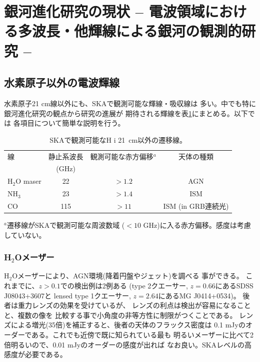 \section{銀河進化研究の現状 -- 電波領域における多波長・他輝線による銀河の観測的研究 --}\label{galaxy.s1.5}


\subsection{水素原子以外の電波輝線}

水素原子21 cm線以外にも、SKAで観測可能な輝線・吸収線は
多い。中でも特に銀河進化研究の観点から研究の進展が
期待される輝線を表\ref{tab:summary_line}にまとめる。以下では
各項目について簡単な説明を行う。

\begin{table}[htbp]
\centering
\begin{minipage}{140mm}
\caption{SKAで観測可能なH {\sc i} 21~cm以外の遷移線。}
\label{tab:summary_line}
\begin{center}
\begin{tabular}{lccc} \hline
線 & 静止系波長 & 観測可能な赤方偏移$^a$ & 天体の種類\\
 & (GHz) &
\\ \hline
H$_2$O maser & 22 & $>1.2$ & AGN \\
NH$_3$ & 23 & $>1.4$ & ISM \\
CO & 115 & $>11$ & ISM (in GRB連続光)\\
\hline
\end{tabular}
\end{center}

$^{a}$遷移線がSKAで観測可能な周波数域
($<10$ GHz)に入る赤方偏移。感度は考慮していない。
\end{minipage}
\end{table}

\subsubsection{H$_2$Oメーザー}

H$_2$Oメーザーにより、AGN環境(降着円盤やジェット)を調べる
事ができる。
これまでに、$z>0.1$での検出例は2例ある
\citep{2005ApJ...628L..89B,2008Natur.456..927I}
(type 2クエーサー, $z=0.66$にあるSDSS J08043+3607と
lensed type 1クエーサー, $z=2.64$にあるMG J0414+0534)。
後者は重力レンズの効果を受けているが、
レンズの利点は検出が容易になることと、複数の像を
比較する事で小角度の非等方性に制限がつくことである。
レンズによる増光(35倍)を補正すると、後者の天体のフラックス密度は
0.1 mJyのオーダーである。これでも近傍で既に知られている最も
明るいメーザーに比べて2倍明るいので、0.01 mJyのオーダーの感度が出れば
なお良い。SKAレベルの高感度が必要である。

